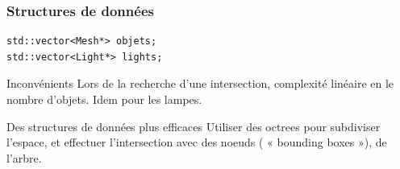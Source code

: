 \begin{frame}[fragile]
\frametitle{Structures de données}

\begin{verbatim}
std::vector<Mesh*> objets;
std::vector<Light*> lights;

\end{verbatim}


{
	\begin{alertblock}{Inconvénients}
	Lors de la recherche d'une intersection, complexité linéaire en le nombre d'objets.
	Idem pour les lampes.
	\end{alertblock}
}

{
	\begin{block}{Des structures de données plus efficaces}
	Utiliser des octrees pour subdiviser l'espace, et effectuer l'intersection avec des noeuds ( « bounding boxes »), de l'arbre.
	\end{block}
}

\end{frame}

